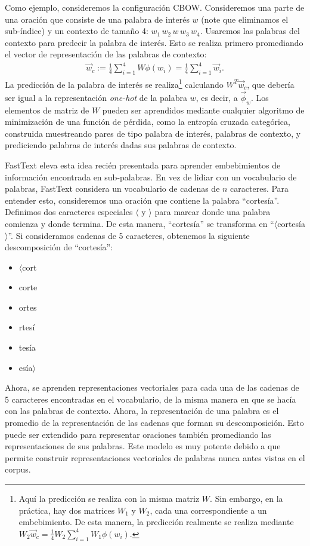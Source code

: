 \documentclass[
  spanish,
]{article}
\providecommand{\tightlist}{%
  \setlength{\itemsep}{0pt}\setlength{\parskip}{0pt}}
\begin{document}
Como ejemplo, consideremos la configuración CBOW. Consideremos una parte
de una oración que consiste de una palabra de interés \(w\) (note que
eliminamos el sub-índice) y un contexto de tamaño 4:
\(w_1\,w_2\,w\,w_3\,w_4\). Usaremos las palabras del contexto para
predecir la palabra de interés. Esto se realiza primero promediando el
vector de representación de las palabras de contexto: \begin{align}
\vec{w}_c := \frac{1}{4}\sum_{i=1}^4 W\phi(w_i) = \frac{1}{4}\sum_{i=1}^4 \vec{w}_i.
\end{align} La predicción de la palabra de interés se realiza\footnote{Aquí
  la predicción se realiza con la misma matriz \(W\). Sin embargo, en la
  práctica, hay dos matrices \(W_1\) y \(W_2\), cada una correspondiente
  a un embebimiento. De esta manera, la predicción realmente se realiza
  mediante \(W_2\vec{w}_c = \frac{1}{4}W_2\sum_{i=1}^4 W_1\phi(w_i)\).}
calculando \(W^T \vec{w}_c\), que debería ser igual a la representación
\emph{one-hot} de la palabra \(w\), es decir, a \(\vec{\phi}_w\). Los
elementos de matriz de \(W\) pueden ser aprendidos mediante cualquier
algoritmo de minimización de una función de pérdida, como la entropía
cruzada categórica, construida muestreando pares de tipo palabra de
interés, palabras de contexto, y prediciendo palabras de interés dadas
sus palabras de contexto.

FastText eleva esta idea recién presentada para aprender embebimientos
de información encontrada en sub-palabras. En vez de lidiar con un
vocabulario de palabras, FastText considera un vocabulario de cadenas de
\(n\) caracteres. Para entender esto, consideremos una oración que
contiene la palabra ``cortesía''. Definimos dos caracteres especiales
\(\langle\) y \(\rangle\) para marcar donde una palabra comienza y donde
termina. De esta manera, ``cortesía'' se transforma en
``\(\langle\)cortesía\(\rangle\)''. Si consideramos cadenas de 5
caracteres, obtenemos la siguiente descomposición de ``cortesía'':

\begin{itemize}
\tightlist
\item
  \(\langle\)cort
\item
  corte
\item
  ortes
\item
  rtesí
\item
  tesía
\item
  esía\(\rangle\)
\end{itemize}

Ahora, se aprenden representaciones vectoriales para cada una de las
cadenas de 5 caracteres encontradas en el vocabulario, de la misma
manera en que se hacía con las palabras de contexto. Ahora, la
representación de una palabra es el promedio de la representación de las
cadenas que forman su descomposición. Esto puede ser extendido para
representar oraciones también promediando las representaciones de sus
palabras. Este modelo es muy potente debido a que permite construir
representaciones vectoriales de palabras nunca antes vistas en el
corpus.
\end{document}
